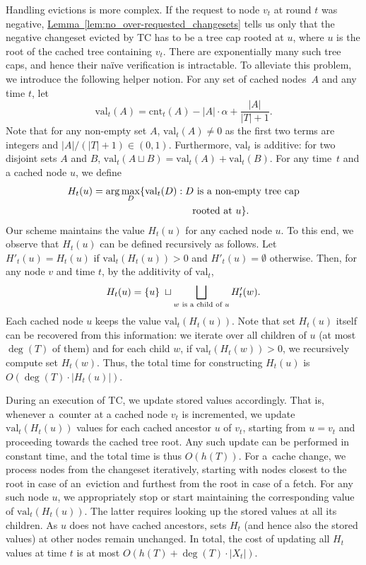 \documentclass[sigconf,screen=true]{acmart}
\newcommand{\lref}[2][]{\hyperref[#2]{#1~\ref*{#2}}}
\newcommand{\ALG}{\textsc{TC}\xspace}
\newcommand{\cnt}{\textrm{cnt}}
\newcommand{\val}{\textrm{val}}
\begin{document}
Handling evictions is more complex. If the request to
node $v_t$ at round $t$ was negative,
\lref[Lemma]{lem:no_over-requested_changesets} tells us only that the negative 
changeset evicted by \ALG has to be a tree cap rooted at $u$, where $u$ is the
root of the cached tree containing $v_t$. There are exponentially many such
tree caps, and hence their naïve verification is intractable. To alleviate
this problem, we introduce the following helper notion. For any set of cached
nodes~$A$ and any time $t$, let
\[
  \val_t(A) = \cnt_t(A) - |A| \cdot \alpha + \frac{|A|}{|T|+1}.
\]
Note that for any non-empty set $A$, $\val_t(A) \neq 0$ as the first two terms
are integers and $|A|/(|T|+1) \in (0,1)$. Furthermore, $\val_t$ is additive:
for two disjoint sets $A$ and $B$, $\val_t(A \sqcup B) =
\val_t(A) + \val_t(B)$. For any time~$t$ and a cached node $u$, we define
\begin{align*}
  H_t(u) = \arg \max_D \{ \val_t(D) : &\; \textnormal{$D$ is a non-empty tree cap} \\
    & \quad \textnormal{rooted at $u$} \}.
\end{align*}
Our scheme maintains the value $H_t(u)$ for any cached node $u$. To this end,
we observe that $H_t(u)$ can be defined recursively as follows. Let
$H'_t(u) = H_t(u)$ if $\val_t(H_t(u)) > 0$ and $H'_t(u) = \emptyset$ otherwise.
Then, for any node $v$ and time $t$, by the additivity of $\val_t$, 
\begin{equation*}
\label{eq:h_t_recurrence}
  H_t(u) = \{ u \} \; \sqcup \bigsqcup_\textnormal{$w$ is a child of $u$} H'_t(w).
\end{equation*}
Each cached node $u$ keeps the value $\val_t(H_t(u))$. Note that set $H_t(u)$
itself can be recovered from this information: we iterate over all children of
$u$ (at most $\deg(T)$ of them) and for each child $w$, if $\val_t(H_t(w)) >
0$, we recursively compute set $H_t(w)$. Thus, the total time for constructing
$H_t(u)$ is $O(\deg(T) \cdot |H_t(u)|)$.

During an execution of \ALG, we update stored values accordingly.
That is, whenever a~counter at a cached node $v_t$ is incremented, we update
$\val_t(H_t(u))$ values for each cached ancestor $u$ of $v_t$, starting from
\mbox{$u = v_t$} and proceeding towards the cached tree root. Any such update can be
performed in constant time, and the total time is thus $O(h(T))$. For a~cache
change, we process nodes from the changeset iteratively, starting with nodes
closest to the root in case of an~eviction and furthest from the root in case
of a fetch. For any such node $u$, we appropriately stop or start maintaining
the corresponding value of $\val_t(H_t(u))$. The latter requires looking up the
stored values at all its children. As $u$ does not have cached
ancestors, sets $H_t$ (and hence also the stored values) at other nodes 
remain unchanged. In total, the
cost of updating all $H_t$ values at time $t$ is at most $O(h(T) + \deg(T)
\cdot |X_t|)$.
\end{document}
